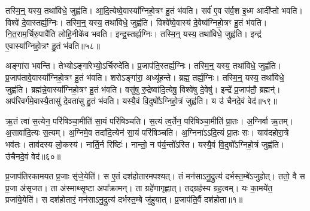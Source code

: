 तस्मि॒न्॒ यस्य॒ तथा॑विधे॒ जुह्व॑ति।
आ॒दि॒त्येष्वे॒वास्या᳚ग्निहो॒त्रꣳ हु॒तं भ॑वति।
सर्व॑ ए॒व स॑र्व॒श इ॒ध्म आदी᳚प्तो भवति।
विश्वे॑ दे॒वास्तर्ह्य॒ग्निः।
तस्मि॒न्॒ यस्य॒ तथा॑विधे॒ जुह्व॑ति।
विश्वे᳚ष्वे॒वास्य॑ दे॒वेष्व॑ग्निहो॒त्रꣳ हु॒तं भ॑वति।
नि॒त॒राम॒र्चिरु॒पावै॑ति लोहि॒नीके॑व भवति।
इन्द्र॒स्तर्ह्य॒ग्निः।
तस्मि॒न्॒ यस्य॒ तथा॑विधे॒ जुह्व॑ति।
इन्द्र॑ ए॒वास्या᳚ग्निहो॒त्रꣳ हु॒तं भ॑वति॥५८॥\ip

अङ्गा॑रा भवन्ति।
तेभ्यो\-ऽङ्गा॑रेभ्यो॒\-ऽर्चिरुदे॑ति।
प्र॒जा\-प॑ति॒\-स्तर्ह्य॒ग्निः।
तस्मि॒न्॒ यस्य॒ तथा॑विधे॒ जुह्व॑ति।
प्र॒जा\-प॑तावे॒वास्या᳚ग्नि\-हो॒त्रꣳ हु॒तं भ॑वति।
शरोऽङ्गा॑रा॒ अध्यू॑हन्ते।
ब्रह्म॒ तर्ह्य॒ग्निः।
तस्मि॒न्॒ यस्य॒ तथा॑विधे॒ जुह्व॑ति।
ब्रह्म॑न्ने॒वास्या᳚ग्निहो॒त्रꣳ हु॒तं भ॑वति।
वसु॑षु रु॒द्रेष्वा॑दि॒त्येषु॒ विश्वे॑षु दे॒वेषु॑।
इन्द्रे᳚ प्र॒जा\-प॑तौ॒ ब्रह्मन्॑।
अप॑रिवर्गमे॒वास्यै॒तासु॑ दे॒वता॑सु हु॒तं भ॑वति।
यस्यै॒वं वि॒दुषो᳚\-ऽग्निहो॒त्रं जुह्व॑ति।
य उ॑ चैनदे॒वं वेद॑॥५९॥\ip\anuvakamend[आ॒दि॒त्यास्तर्ह्य॒ग्निरिन्द्र॑ ए॒वास्या᳚ग्निहो॒त्रꣳ हु॒तं भ॑वति दे॒वेषु॑ च॒त्वारि॑ च (यद॒ग्निन्निहि॑तः प्रथ॒मꣳ सर्व॑ ए॒व नि॑त॒रामङ्गा॑राः॒ शरो\-ऽङ्गा॑रा॒ ब्रह्म॒ वसु॑ष्व॒ष्टौ॥)]

ऋ॒तं त्वा॑ स॒त्येन॒ परि॑षिञ्चा॒मीति॑ सा॒यं परि॑षिञ्चति।
स॒त्यं त्व॒र्तेन॒ परि॑षिञ्चा॒मीति॑ प्रा॒तः।
अ॒ग्निर्वा ऋ॒तम्।
अ॒सावा॑दि॒त्यः स॒त्यम्।
अ॒ग्निमे॒व तदा॑दि॒त्येन॑ सा॒यं परि॑षिञ्चति।
अ॒ग्निना॑\-ऽऽदि॒त्यं प्रा॒तः सः।
याव॑दहोरा॒त्रे भव॑तः।
ताव॑दस्य लो॒कस्य॑।
नार्ति॒र्न रिष्टिः॑।
नान्तो॒ न प॑र्य॒न्तो᳚\-ऽस्ति।
यस्यै॒वं वि॒दुषो᳚\-ऽग्निहो॒त्रं जुह्व॑ति। उ॑चैनदे॒वं वेद॑॥६०॥\ip\anuvakamend[अ॒स्ति॒ द्वे च॑]


\clearpage
{}
\setcounter{anuvakam}{0}

प्र॒जा\-प॑तिरकामयत प्र॒जाः सृ॑जे॒येति॑।
स ए॒तं दश॑होतारम\-पश्यत्।
तं मन॑सा\-ऽनु॒द्रुत्य॑ दर्भस्त॒म्बे॑\-ऽजुहोत्।
ततो॒ वै स प्र॒जा अ॑\-सृजत।
ता अ॑स्माथ्सृ॒ष्टा अपा᳚क्रामन्।
ता ग्रहे॑णागृह्णात्।
तद्ग्रह॑स्य ग्रह॒त्वम्।
यः का॒मये॑त॒ प्रजा॑ये॒येति॑।
स दश॑होतारं॒ मन॑सा\-ऽनु॒द्रुत्य॑ दर्भस्त॒म्बे जु॑हुयात्।
प्र॒जा\-प॑ति॒र्वै दश॑होता॥१॥\ip

